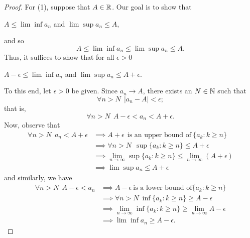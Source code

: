 \documentclass[a4paper]{article}
\begin{document}
\begin{proof}
    For (1), suppose that \( A \in \mathbb{R}  \). Our goal is to show that  
    \begin{center}
        \( A \leq \lim \inf {a}_{n}  \) and \( \lim \sup {a}_{n} \leq A  \),
    \end{center}
    and so
    \[  A \leq \lim \inf {a}_{n} \leq \lim \sup {a}_{n} \leq A.  \]
    Thus, it suffices to show that for all \( \epsilon > 0  \)
    \begin{center}
        \( A - \epsilon \leq \lim \inf {a}_{n} \) and \( \lim \sup {a}_{n} \leq A + \epsilon \).
    \end{center}
    To this end, let \( \epsilon > 0  \) be given. Since \( {a}_{n} \to A  \), there exists an \( N \in \mathbb{N}  \) such that 
    \[  \forall n > N \ \ | {a}_{n} - A  |  < \epsilon; \]
    that is, 
    \[  \forall n > N \ \ A - \epsilon < {a}_{n} < A + \epsilon. \]
    Now, observe that
    \begin{align*}
        \forall n > N \ \ {a}_{n} < A + \epsilon &\implies A + \epsilon \ \ \text{is an upper bound of} \ \{ {a}_{k } : k \geq n  \}  \\
                                                 &\implies \forall n > N \ \ \sup \{ {a}_{k } : k \geq n \}  \leq A + \epsilon \\
                                                 &\implies \lim_{ n \to \infty  }  \sup \{ {a}_{ k } : k \geq n  \}  \leq \lim_{ n \to \infty  }  (A + \epsilon) \tag{Order Limit Theorem} \\
                                                 &\implies  \lim \sup  {a}_{n} \leq A + \epsilon
    \end{align*}
    and similarly, we have 
    \begin{align*}
        \forall n > N \ \  A  - \epsilon <  {a}_{n}  &\implies A - \epsilon \ \text{is a lower bound of} \{ {a}_{k } : k \geq n  \}  \\
                                                     &\implies \forall n > N  \ \inf \{ {a}_{ k } : k \geq n  \}  \geq A - \epsilon \\
                                                     &\implies \lim_{ n \to \infty  }  \inf \{ {a}_{k } : k \geq n  \}  \geq \lim_{ n \to \infty  }  A - \epsilon \\
                                                     &\implies \lim \inf {a}_{n} \geq A - \epsilon.
    \end{align*}


\end{proof}
\end{document}
